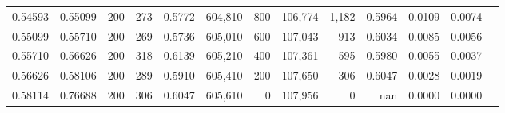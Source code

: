 \begin{tabular}{rrrrrrrrrrrrr}
0.54593 & 0.55099 &   200 & 273 &                                     0.5772 & 604,810 &     800 & 106,774 &   1,182 & 0.5964 & 0.0109 & 0.0074 \\
0.55099 & 0.55710 &   200 & 269 &                                     0.5736 & 605,010 &     600 & 107,043 &     913 & 0.6034 & 0.0085 & 0.0056 \\
0.55710 & 0.56626 &   200 & 318 &                                     0.6139 & 605,210 &     400 & 107,361 &     595 & 0.5980 & 0.0055 & 0.0037 \\
0.56626 & 0.58106 &   200 & 289 &                                     0.5910 & 605,410 &     200 & 107,650 &     306 & 0.6047 & 0.0028 & 0.0019 \\
0.58114 & 0.76688 &   200 & 306 &                                     0.6047 & 605,610 &       0 & 107,956 &       0 &    nan & 0.0000 & 0.0000 \\
\bottomrule
\end{tabular}
